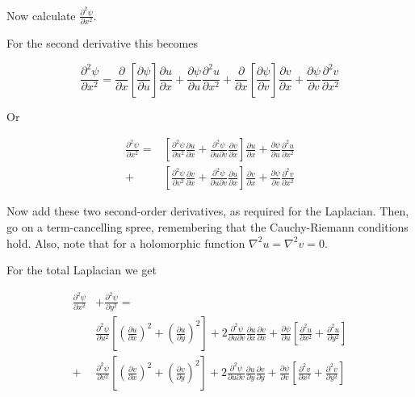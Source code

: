 \begin{cue}
Now calculate $\frac{\partial^2 \psi}{\partial x^2}$.
\end{cue}

For the second derivative this becomes

\begin{equation}
\frac{\partial^2 \psi}{\partial x^2} = \frac{\partial}{\partial x} \left[
\frac{\partial \psi}{\partial u}\right]  \frac{\partial u}{\partial x} +
\frac{\partial \psi}{\partial u}\frac{\partial^2 u}{\partial x^2} +  
\frac{\partial}{\partial x} \left[ \frac{\partial \psi}{\partial v}\right] 
\frac{\partial v}{\partial x}  + \frac{\partial \psi}{\partial
v}\frac{\partial^2 v}{\partial x^2}
\end{equation} 

Or

\begin{align}
\frac{\partial^2 \psi}{\partial x^2} = &\left[ \frac{\partial^2 \psi}{\partial u^2 } \frac{\partial u}{\partial x} +  \frac{\partial^2 \psi}{\partial u \partial v} \frac{\partial v}{\partial x} \right] \frac{\partial u}{\partial x}  + \frac{\partial \psi}{\partial u}\frac{\partial^2 u}{\partial x^2} \nonumber \\ 
+ &\left[ \frac{\partial^2 \psi}{\partial v^2 } \frac{\partial v}{\partial x} + 
\frac{\partial^2 \psi}{\partial u \partial v} \frac{\partial u}{\partial x}
\right] \frac{\partial v}{\partial x} + \frac{\partial \psi}{\partial v}\frac{\partial^2 v}{\partial x^2}
\end{align} 

\begin{cue}
Now add these two second-order derivatives, as required for the Laplacian. Then, go on a term-cancelling spree, remembering that the Cauchy-Riemann conditions hold. Also, note that for a holomorphic function $\nabla^2 u = \nabla^2 v=0$.
\end{cue}

For the total Laplacian we get

\begin{align}
\frac{\partial^2 \psi}{\partial x^2} &+ \frac{\partial^2 \psi}{\partial y^2}= \nonumber \\
  &\frac{\partial^2 \psi}{\partial u^2 }  \left [ \left(\frac{\partial u}{\partial x}\right)^2 + \left(\frac{\partial u}{\partial y}\right)^2\right] + 2\frac{\partial^2 \psi}{\partial u \partial v} \frac{\partial u}{\partial x} \frac{\partial v}{\partial x}  + \frac{\partial \psi}{\partial u} \left[ \frac{\partial^2 u}{\partial x^2}  + \frac{\partial^2 u}{\partial y^2} \right]   \nonumber \\  
+ &\frac{\partial^2 \psi}{\partial v^2}  \left[ \left(\frac{\partial v}{\partial
x}\right)^2 + \left(\frac{\partial v}{\partial y}\right)^2\right]+  2\frac{\partial^2 \psi}{\partial u \partial v} \frac{\partial u}{\partial y} \frac{\partial v}{\partial y} + \frac{\partial
\psi}{\partial v} \left[ \frac{\partial^2 v}{\partial x^2} + \frac{\partial^2 v}{\partial y^2} \right] 
\label{eq-conf-trans-1}
\end{align} 

